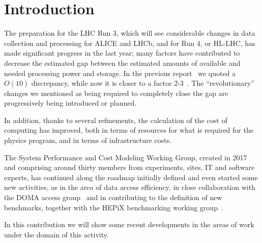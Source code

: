 \section{Introduction}
The preparation for the LHC Run 3, which will see considerable changes
in data collection and processing for ALICE and LHCb, and for Run 4,
or HL-LHC, has made significant progress in the last year; many
factors have contributed to decrease the estimated gap between the
estimated amounts of available and needed processing power and
storage.  In the previous report~\cite{costmodel} we quoted a $O(10)$
discrepancy, while now it is closer to a factor 2-3~\cite{extrap}. The
``revolutionary'' changes we mentioned as being required to completely
close the gap are progressively being introduced or planned.

In addition, thanks to several refinements, the calculation of the
cost of computing has improved, both in terms of resources for what is
required for the physics program, and in terms of infrastructure
costs.

The System Performance and Cost Modeling Working Group, created in
2017 and comprising around thirty members from experiments, sites, IT
and software experts, has continued along the roadmap initially
defined and even started some new activities, as in the area of data
access efficiency, in close collaboration with the DOMA access
group~\cite{domaaccess} and in contributing to the definition of new
benchmarks, together with the HEPiX benchmarking working
group~\cite{bench}.

In this contribution we will show some recent developments in the
areas of work under the domain of this activity.
